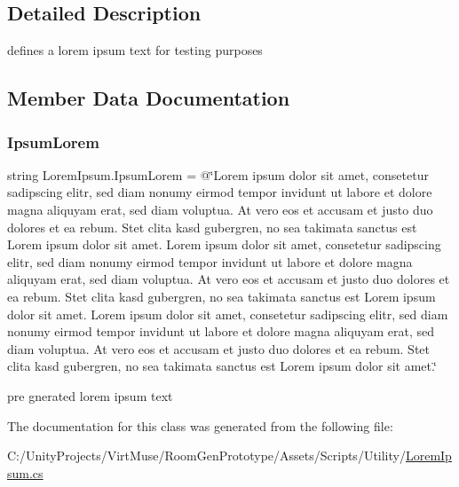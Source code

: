 \subsection{Detailed Description}
defines a lorem ipsum text for testing purposes 



\subsection{Member Data Documentation}
\mbox{\label{class_lorem_ipsum_a1a11ef50e3a5b94928207b15b4ce6fa6}} 
\subsubsection{\texorpdfstring{Ipsum\+Lorem}{IpsumLorem}}
{\footnotesize\ttfamily string Lorem\+Ipsum.\+Ipsum\+Lorem = @\char`\"{}Lorem ipsum dolor sit amet, consetetur sadipscing elitr, sed diam nonumy eirmod tempor invidunt ut labore et dolore magna aliquyam erat, sed diam voluptua. At vero eos et accusam et justo duo dolores et ea rebum. Stet clita kasd gubergren, no sea takimata sanctus est Lorem ipsum dolor sit amet. Lorem ipsum dolor sit amet, consetetur sadipscing elitr, sed diam nonumy eirmod tempor invidunt ut labore et dolore magna aliquyam erat, sed diam voluptua. At vero eos et accusam et justo duo dolores et ea rebum. Stet clita kasd gubergren, no sea takimata sanctus est Lorem ipsum dolor sit amet. Lorem ipsum dolor sit amet, consetetur sadipscing elitr, sed diam nonumy eirmod tempor invidunt ut labore et dolore magna aliquyam erat, sed diam voluptua. At vero eos et accusam et justo duo dolores et ea rebum. Stet clita kasd gubergren, no sea takimata sanctus est Lorem ipsum dolor sit amet.\char`\"{}\hspace{0.3cm}{\ttfamily [static]}}



pre gnerated lorem ipsum text 



The documentation for this class was generated from the following file\+:\begin{DoxyCompactItemize}
\item 
C\+:/\+Unity\+Projects/\+Virt\+Muse/\+Room\+Gen\+Prototype/\+Assets/\+Scripts/\+Utility/\mbox{\hyperlink{_lorem_ipsum_8cs}{Lorem\+Ipsum.\+cs}}\end{DoxyCompactItemize}
